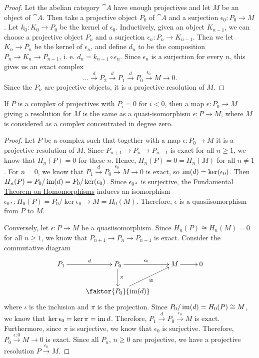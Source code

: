 \begin{proof}
	Let the abelian category $\cat{A}$ have enough projectives and let $M$ be an object of $\cat{A}$.
	Then take a projective object $P_0$ of $\cat{A}$ and a surjection $\epsilon_0:P_0 \rightarrow M$.
	Let $k_0: K_0 \rightarrow P_0$ be the kernel of $\epsilon_0$.
	Inductively, given an object $K_{n-1}$, we can choose a projective object $P_n$ and a surjection $\epsilon_n: P_n \rightarrow K_{n-1}$.
	Then we let $K_n \rightarrow P_n$ be the kernel of $\epsilon_n$, and define $d_n$ to be the composition $P_n \rightarrow K_n \rightarrow P_{n-1}$, i. e. $d_n = k_{n-1}\circ\epsilon_{n}$.
	Since $\epsilon_n$ is a surjection for every $n$, this gives us an exact complex
	\[\dots \overset{d}{\longrightarrow} P_2 \overset{d}{\longrightarrow} P_1 \overset{d}{\longrightarrow} P_0 \overset{\epsilon_0}{\longrightarrow} M \rightarrow 0.\]
	Since the $P_n$ are projective objects, it is a projective resolution of $M$.
\end{proof}

\begin{exercise}
	If $P$ is a complex of projectives with $P_i=0$ for $i<0$, then a map $\epsilon:P_0\rightarrow M$ giving a resolution for $M$ is the same as a quasi-isomorphism $\epsilon:P\rightarrow M$, where $M$ is considered as a complex concentrated in degree zero.
\end{exercise}

\begin{proof}
	Let $P$ be a complex such that together with a map $\epsilon: P_0 \rightarrow M$ it is a projective resolution of $M$.
	Since $P_{n+1} \rightarrow P_n \rightarrow P_{n-1}$ is exact for all $n\geq1$, we know that $H_n(P)=0$ for these $n$.
	Hence, $H_n(P) = 0 = H_n(M)$ for all $n \neq 1$.
	For $n=0$, we know that $P_1 \overset{d}{\longrightarrow} P_0 \overset{\epsilon_0}{\longrightarrow} M \rightarrow 0$ is exact, so $\operatorname{im}(d) = \ker(\epsilon_0)$.
	Then $H_n(P) = P_0 / \operatorname{im}(d) = P_0 / \ker(\epsilon_0)$.
	Since $\epsilon_{0*}$ is surjective, the \hyperref[FTH]{Fundamental Theorem on Homomorphisms} induces an isomorphism $\epsilon_{0*}: H_0(P)=P_0/\ker\epsilon_0 \rightarrow M = H_0(M)$.
	Therefore, $\epsilon$ is a quasiisomorphism from $P$ to $M$.
	
	Conversely, let $\epsilon: P \rightarrow M$ be a quasiisomorphism.
	Since $H_n(P) \cong H_n(M) = 0$ for all $n \geq 1$, we know that $P_{n+1} \rightarrow P_n \rightarrow P_{n-1}$ is exact.
	Consider the commutative diagram
	\[
		\xymatrix{
			P_1 \ar[r]^-d &P_0 \ar[r]^{\epsilon_0} \ar[d]^-{\pi} &M \ar[r] &0 \\
			&\faktor{P_0}{\im(d)} \ar[ur]_-{\cong} & &
		}
	\]
	where $\iota$ is the inclusion and $\pi$ is the projection.
	Since $P_0 / \operatorname{im}(d) = H_0(P) \cong M$, we know that $\ker\epsilon_0 = \ker\pi = \operatorname{im} d$.
	Therefore, $P_1 \overset{d}{\longrightarrow} P_0 \overset{\epsilon_0}{\longrightarrow} M$ is exact.
	Furthermore, since $\pi$ is surjective, we know that $\epsilon_0$ is surjective.
	Therefore, $P_0 \overset{\epsilon:0}{\longrightarrow} M \rightarrow 0$ is exact.
	Since all $P_n$, $n\geq 0$ are projective, we have a projective resolution $P \overset{\epsilon_0}{\longrightarrow} M$.
\end{proof}

